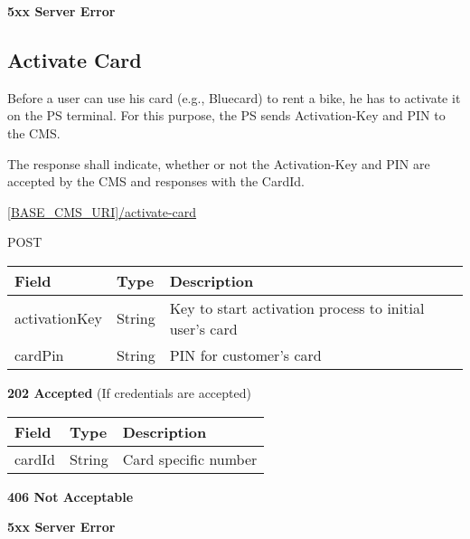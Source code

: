 \textbf{5xx Server Error}

\subsection{Activate Card}

Before a user can use his card (e.g., Bluecard) to rent a bike, he has to activate it on the \acs{PS} terminal. For this purpose, the \acs{PS} sends Activation-Key and PIN to the \acs{CMS}.

The response shall indicate, whether or not the Activation-Key and PIN are accepted by the \acs{CMS} and responses with the CardId.

 \url{[BASE_CMS_URI]/activate-card}

 POST

\begin{table}[!h]
\vspace{-7mm}
\begin{tabularx}{\linewidth}{ | l | l | X | }
  \hline
  \rowcolor{table-head}
  Field & Type & Description \\
  \hline
  	activationKey & String & Key to start activation process to initial user's card\\
  	cardPin & String & PIN for customer's card\\
    \hline
\end{tabularx}
\end{table}

\textbf{202 Accepted} (If credentials are accepted)

\begin{table}[!h]
\begin{tabularx}{\linewidth}{ | l | l | X | }
  \hline
  \rowcolor{table-head}
  Field & Type & Description \\
  \hline
  	cardId 		& String & Card specific number\\
    \hline
\end{tabularx}
\end{table}

 \textbf{406 Not Acceptable}

\textbf{5xx Server Error}

